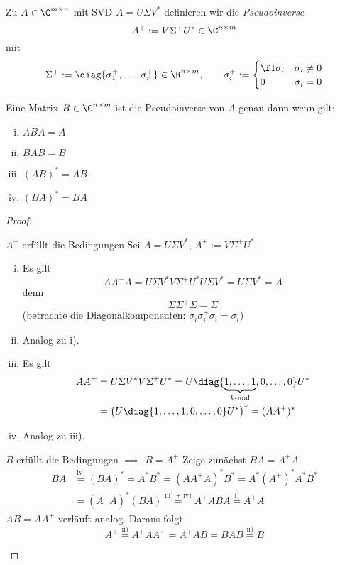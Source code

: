 \documentclass[11pt]{scrartcl}
\begin{document}
\begin{df}[Pseudoinverse]
	\label{1.39}	
	Zu $A\in \C^{m\times n}$ mit SVD $A=U\Sigma V^*$ definieren wir die \emph{Pseudoinverse}
	\[
		A^+ := V \Sigma^+ U^* \in \C^{n\times m}
	\]
	mit
	\[
		\Sigma^+ := \diag\{\sigma_1^+,\dotsc, \sigma_r^+\} \in \R^{n\times m}
		,\qquad \sigma_i^+ := \begin{cases}
			\f 1{\sigma_i}	& \sigma_i \neq 0 \\
			0 & \sigma_i = 0
		\end{cases}
	\]
\end{df}

\begin{st}
	\label{1.40}
	Eine Matrix $B\in \C^{n\times m}$ ist die Pseudoinverse von $A$ genau dann wenn gilt:
	\begin{enumerate}[i)]
		\item
			$ABA = A$
		\item
			$BAB = B$
		\item
			$(AB)^* = AB$
		\item
			$(BA)^* = BA$
	\end{enumerate}
	\begin{proof}
		\begin{seg}{$A^+$ erfüllt die Bedingungen}
			Sei $A=U\Sigma V^*$, $A^+ := V\Sigma^+U^*$.
			\begin{enumerate}[i)]
				\item
					Es gilt
					\[
						AA^+A = U\Sigma V^* V \Sigma^+ U^* U \Sigma V^* = U\Sigma V^* = A
					\]
					denn
					\[
						\Sigma \Sigma^+ \Sigma = \Sigma
					\]
					(betrachte die Diagonalkomponenten: $\sigma_i \sigma_i^+ \sigma_i = \sigma_i$)
				\item
					Analog zu i).
				\item
					Es gilt
					\begin{align*}
						AA^+ &= U \Sigma V^* V \Sigma^+ U^* = U \diag\{\underbrace{1,\dotsc,1}_{k\text{-mal}},0,\dotsc, 0\} U^*\\ &= \big(U \diag\{1,\dotsc,1,0,\dotsc,0\} U^*\big)^* = (AA^+)^*
					\end{align*}
				\item
					Analog zu iii).
			\end{enumerate}
		\end{seg}
		\begin{seg}{$B$ erfüllt die Bedingungen $\implies$ $B=A^+$}
			Zeige zunächst $BA=A^+A$
			\begin{align*}
				BA &\stackrel{\text{iv)}}= (BA)^* = A^*B^* = (AA^+A)^*B^* = A^*(A^+)^*A^*B^*\\ &= (A^+A)^*(BA) \stackrel{\text{iii) + iv)}}= A^+ABA \stackrel{\text{i)}} = A^+A
			\end{align*}
			$AB=AA^+$ verläuft analog.
			Daraus folgt
			\[
				A^+ \stackrel{\text{ii)}}= A^+AA^+ = A^+AB = BAB \stackrel{\text{ii)}}= B 
			\]
		\end{seg}
	\end{proof}
\end{st}
\end{document}
